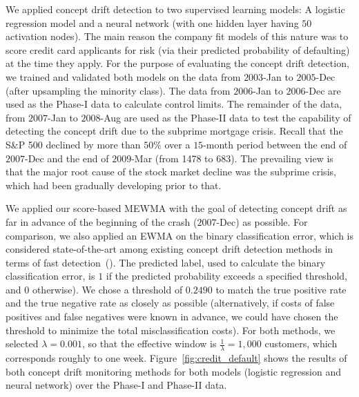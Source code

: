 \documentclass[twoside,11pt]{article}
\begin{document}
We applied concept drift detection to two supervised learning models:  A logistic regression model and a neural network (with one hidden layer having $50$ activation nodes). The main reason the company fit models of this nature was to score credit card applicants for risk (via their predicted probability of defaulting) at the time they apply. For the purpose of evaluating the concept drift detection, we trained and validated both models on the data from $2003$-Jan to $2005$-Dec (after upsampling the minority class). The data from $2006$-Jan to $2006$-Dec are used as the Phase-I data to calculate control limits. The remainder of the data, from $2007$-Jan to $2008$-Aug are used as the Phase-II data to test the capability of detecting the concept drift due to the subprime mortgage crisis. Recall that the S\&P 500 declined by more than $50\%$ over a $15$-month period between the end of $2007$-Dec and the end of $2009$-Mar (from 1478 to 683). The prevailing view is that the major root cause of the stock market decline was the subprime crisis, which had been gradually developing prior to that.

We applied our score-based MEWMA with the goal of detecting concept drift as far in advance of the beginning of the crash ($2007$-Dec) as possible. For comparison, we also applied an EWMA on the binary classification error, which is considered state-of-the-art among existing concept drift detection methods in terms of fast detection~(\cite{barros2018large}). The predicted label, used to calculate the binary classification error, is $1$ if the predicted probability exceeds a specified threshold, and $0$ otherwise). We chose a threshold of $0.2490$ to match the true positive rate and the true negative rate as closely as possible (alternatively, if costs of false positives and false negatives were known in advance, we could have chosen the threshold to minimize the total misclassification costs). For both methods, we selected $\lambda = 0.001$, so that the effective window is $\frac{1}{\lambda} = 1,000$ customers, which corresponds roughly to one week. Figure~\ref{fig:credit_default} shows the results of both concept drift monitoring methods for both models (logistic regression and neural network) over the Phase-I and Phase-II data. 
\end{document}
